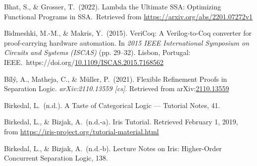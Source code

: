 \documentclass[12pt,twoside]{article}
\begin{document}
{\begin{thebibliography}{1079}
\mdbibitemlabel{}Bhat, S., \& Grosser, T.~(2022). Lambda the Ultimate SSA: Optimizing Functional Programs in SSA.~Retrieved from \href{https://arxiv.org/abs/2201.07272v1}{{\ttfamily https://\hspace{0pt}arxiv.\hspace{0pt}org/\hspace{0pt}abs/\hspace{0pt}2201.\hspace{0pt}07272v1}}%

\mdbibitemlabel{}Bidmeshki, M.-M., \& Makris, Y.~(2015). VeriCoq: A Verilog-to-Coq converter for proof-carrying hardware automation. In \emph{2015 IEEE International Symposium on Circuits and Systems (ISCAS)} (pp. 29–32). Lisbon, Portugal: IEEE.~https://doi.org/\href{https://dx.doi.org/10.1109/ISCAS.2015.7168562}{10.1109/ISCAS.2015.7168562}%

\mdbibitemlabel{}Bílý, A., Matheja, C., \& Müller, P.~(2021). Flexible Refinement Proofs in Separation Logic. \emph{arXiv:2110.13559 {}[cs]}. Retrieved from arXiv:\href{http://arxiv.org/abs/2110.13559}{2110.13559}%

\mdbibitemlabel{}Birkedal, L.~(n.d.). A Taste of Categorical Logic — Tutorial Notes, 41.%

\mdbibitemlabel{}Birkedal, L., \& Bizjak, A.~(n.d.-a). Iris Tutorial. Retrieved February 1, 2019, from \href{https://iris-project.org/tutorial-material.html}{{\ttfamily https://\hspace{0pt}iris-\hspace{0pt}project.\hspace{0pt}org/\hspace{0pt}tutorial-\hspace{0pt}material.\hspace{0pt}html}}%

\mdbibitemlabel{}Birkedal, L., \& Bizjak, A.~(n.d.-b). Lecture Notes on Iris: Higher-Order Concurrent Separation Logic, 138.%


\end{thebibliography}}
\end{document}
